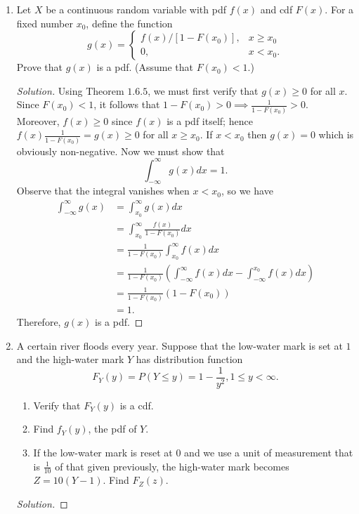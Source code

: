\documentclass[12pt]{article}
\theoremstyle{definition}
\theoremstyle{plain}
\newenvironment{solution}
  {\begin{proof}[Solution]}
  {\end{proof}}
\begin{document}
\begin{enumerate}
\item Let $ X $ be a continuous random variable with pdf $  f(x)$ and cdf $ F(x) $. For a fixed number $ x_0 $, define the function
\[ g(x) = 
\begin{cases}
	f(x) / [1 - F(x_0)], & x \geq x_0 \\
	0, &  x < x_0.
\end{cases}\]
Prove that $ g(x) $ is a pdf. (Assume that $ F(x_0) < 1. $)

\begin{solution}
Using Theorem $ 1.6.5 $, we must first verify that $ g(x) \geq 0 $ for all $ x $. Since $ F(x_0) < 1 $, it follows that $ 1 - F(x_0) > 0 \implies \frac{1}{1 - F(x_0)} > 0 $. Moreover, $ f(x) \geq 0 $ since $ f(x) $ is a pdf itself; hence $ f(x) \frac{1}{1 - F(x_0)} = g(x) \geq 0 $ for all $ x \geq x_0$. If $ x < x_0$ then $ g(x) = 0 $ which is obviously non-negative. Now we must show that 
\[ \int_{-\infty}^\infty g(x) dx = 1. \]
Observe that the integral vanishes when $ x < x_0 $, so we have
\begin{align*}
	\int_{-\infty}^\infty g(x) &= \int_{x_0}^\infty g(x)dx\\
	&= \int_{x_0}^\infty \frac{f(x)}{1 - F(x_0)} dx\\
	&= \frac{1}{1 - F(x_0)} \int_{x_0}^\infty f(x) dx\\
	&= \frac{1}{1 - F(x_0)} \left ( \int_{-\infty}^\infty  f(x) dx - \int_{-\infty}^{x_0} f(x) dx\right)\\
	&= \frac{1}{1 - F(x_0)} (1 - F(x_0))\\
	&= 1.
\end{align*}
Therefore, $ g(x) $ is a pdf.
\end{solution}

\item A certain river floods every year. Suppose that the low-water mark is set at $ 1 $ and the high-water mark $ Y $ has distribution function
\[ F_Y(y) = P(Y \leq y) = 1 - \frac{1}{y^2}, 1 \leq y < \infty. \]
\begin{enumerate}
\item Verify that $ F_Y(y) $ is a cdf.
\item Find $ f_Y(y) $, the pdf of $ Y $.
\item If the low-water mark is reset at $ 0 $ and we use a unit of measurement that is $ \frac{1}{10} $ of that given previously, the high-water mark becomes $ Z = 10(Y - 1) $. Find $ F_Z(z) $.
\end{enumerate}

\begin{solution}


\end{solution}
\end{enumerate}
\end{document}
